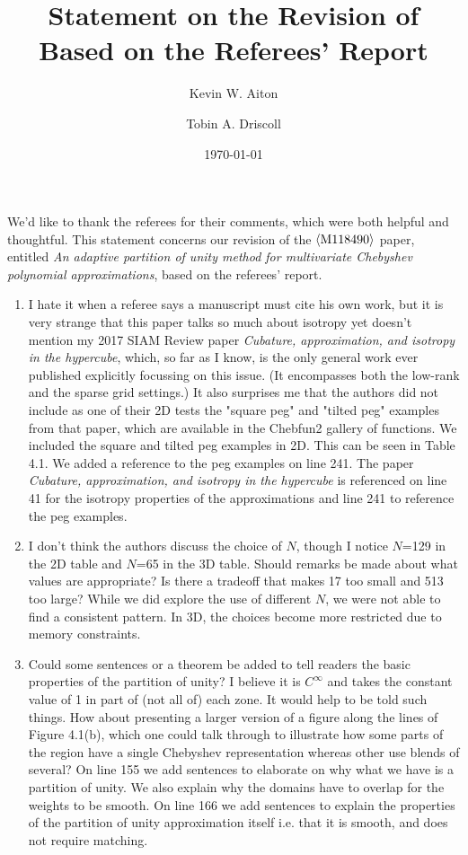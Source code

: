 \documentclass[10pt]{article}
\title{Statement on the Revision of \meta{M118490} \\
  Based on the Referees' Report}
\author{Kevin W. Aiton \and Tobin A. Driscoll}
\date{\today}
\newcommand\meta[1]{$\langle\hbox{#1}\rangle$}
\begin{document}
We'd like to thank the referees for their comments, which were both helpful and thoughtful. This statement concerns our revision of the \meta{M118490} paper,
entitled \textit{An adaptive partition of unity method for multivariate Chebyshev polynomial approximations}, based on the referees' report.

\begin{enumerate}
\item \begin{response}{  I hate it when a referee says a manuscript must cite his own work, but it is very strange that this paper
talks so much about isotropy yet doesn't mention my 2017
SIAM Review paper \textit{Cubature, approximation, and isotropy
in the hypercube}, which, so far as I know, is the only
general work ever published explicitly focussing on this
issue. (It encompasses both the low-rank and the sparse
grid settings.) It also surprises me that the authors did
not include as one of their 2D tests the "square peg" and
"tilted peg" examples from that paper, which are available
in the Chebfun2 gallery of functions. }
We included the square and tilted peg examples in 2D. This can be seen in Table 4.1. We added a reference to the peg examples on line 241. The paper \textit{Cubature, approximation, and isotropy in the hypercube} is referenced on line 41 for the isotropy properties of the approximations and line 241 to reference the peg examples.
\end{response}

\item \begin{response}{ I don't think the authors discuss the choice of $N$, though I notice $N$=129 in the 2D table and $N$=65 in the
3D table. Should remarks be made about what values are
appropriate? Is there a tradeoff that makes 17 too small
and 513 too large? }
While we did explore the use of different $N$, we were not able to find a consistent pattern. In 3D, the choices become more restricted due to memory constraints.
\end{response}

\item \begin{response}{ Could some sentences or a theorem be added to tell readers the basic properties of the partition of unity?
I believe it is $C^{\infty}$ and takes the constant value of
1 in part of (not all of) each zone. It would help to be
told such things. How about presenting a larger version
of a figure along the lines of Figure 4.1(b), which one
could talk through to illustrate how some parts of the
region have a single Chebyshev representation whereas
other use blends of several?}
On line 155 we add sentences to elaborate on why what we have is a partition of unity. We also explain why the domains have to overlap for the weights to be smooth. On line 166 we add sentences to explain the properties of the partition of unity approximation itself i.e. that it is smooth, and does not require matching.


\end{response}
\end{enumerate}
\end{document}
